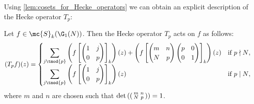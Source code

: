     Using \cref{lem:cosets_for_Hecke_operators} we can obtain an explicit description of the Hecke operator $T_{p}$:

    \begin{proposition}\label{prop:explicit_description_of_Hecke_operators_holomorphic}
      Let $f \in \mc{S}_{k}(\G_{1}(N))$. Then the Hecke operator $T_{p}$ acts on $f$ as follows:
      \[
        (T_{p}f)(z) = \begin{cases} \displaystyle{\sum_{j \tmod{p}}}\left(f\left[\begin{pmatrix} 1 & j \\ 0 & p \end{pmatrix}\right]_{k}\right)(z)+\left(f\left[\begin{pmatrix} m & n \\ N & p \end{pmatrix}\begin{pmatrix} p & 0 \\ 0 & 1 \end{pmatrix}\right]_{k}\right)(z) & \text{if $p \nmid N$}, \\ \displaystyle{\sum_{j \tmod{p}}}\left(f\left[\begin{pmatrix} 1 & j \\ 0 & p \end{pmatrix}\right]_{k}\right)(z) & \text{if $p \mid N$}, \end{cases}
      \]
      where $m$ and $n$ are chosen such that $\det\left(\begin{psmallmatrix} m & n \\ N & p \end{psmallmatrix}\right) = 1$.
    \end{proposition}
